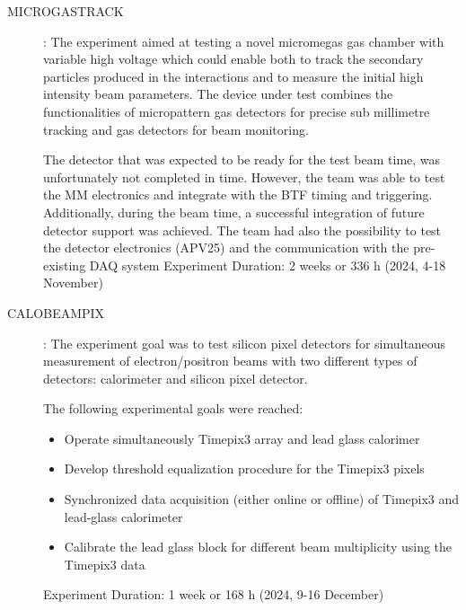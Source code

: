 \begin{description}
\item[MICROGASTRACK]:
The experiment aimed at testing a novel micromegas gas chamber with variable high voltage which could enable both to track the secondary particles produced in the interactions and to measure the initial high intensity beam parameters. The device under test combines the functionalities of micropattern gas detectors for precise sub millimetre tracking and gas detectors for beam monitoring.

The detector that was expected to be ready for the test beam time, was unfortunately not completed in time. However, the team was able to test the MM electronics and integrate with the BTF timing and triggering. Additionally, during the beam time, a successful integration of future detector support was achieved. The team had also the possibility to test the detector electronics (APV25) and the communication with the pre-existing DAQ system
Experiment Duration: 2 weeks or 336 h (2024, 4-18 November)

\item[CALOBEAMPIX]:
The experiment goal was to test silicon pixel detectors for simultaneous measurement of electron/positron beams with two different types of detectors: calorimeter and silicon pixel detector. 

The following experimental goals were reached:
\begin{itemize}
    \item Operate simultaneously Timepix3 array and lead glass calorimer
    \item Develop threshold equalization procedure for the Timepix3 pixels
    \item Synchronized data acquisition (either online or offline) of Timepix3 and lead-glass calorimeter
    \item Calibrate the lead glass block for different beam multiplicity using the Timepix3 data
\end{itemize}
Experiment Duration: 1 week or 168 h (2024, 9-16 December)
\end{description}




